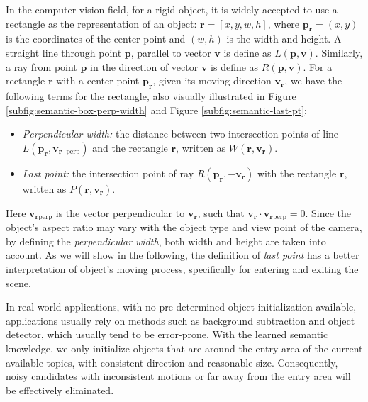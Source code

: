     In the computer vision field, for a rigid object, it is widely accepted to use a rectangle as the representation of an object: $\bm{r} = [x, y, w, h]$, where $\bm{p_r}=(x, y)$ is the coordinates of the center point and $(w, h)$ is the width and height.
    A straight line through point $\bm{p}$, parallel to vector $\bm{v}$ is define as $L(\bm{p}, \bm{v})$. Similarly, a ray from point $\bm{p}$ in the direction of vector $\bm{v}$ is define as $R(\bm{p}, \bm{v})$.
    For a rectangle $\bm{r}$ with a center point $\bm{p_r}$, given its moving direction $\bm{v_r}$, we have the following terms for the rectangle, also visually illustrated in Figure \ref{subfig:semantic-box-perp-width} and Figure \ref{subfig:semantic-last-pt}:  
    \begin{itemize}
        \item \emph{Perpendicular width:} the distance between two intersection points of line $L(\bm{p_r}, \bm{v}_{\bm{r}\cdot\text{perp}})$ and the rectangle $\bm{r}$, written as $W(\bm{r}, \bm{v_r})$. 
        \item \emph{Last point:} the intersection point of ray $R(\bm{p_r}, \bm{-v_r})$ with the rectangle $\bm{r}$, written as $P(\bm{r}, \bm{v_r})$.
    \end{itemize}
    Here $\bm{v}_{\bm{r}\text{perp}}$ is the vector perpendicular to $\bm{v_r}$, such that $\bm{v_r}\cdot\bm{v}_{\bm{r}\text{perp}}=0$. Since the object's aspect ratio may vary with the object type and view point of the camera, by defining the \emph{perpendicular width}, both width and height are taken into account. As we will show in the following, the definition of \emph{last point} has a better interpretation of object's moving process, specifically for entering and exiting the scene.

    

    In real-world applications, with no pre-determined object initialization available, applications usually rely on methods such as background subtraction and object detector, which usually tend to be error-prone.
    With the learned semantic knowledge, we only initialize objects that are around the entry area of the current available topics, with consistent direction and reasonable size. Consequently, noisy candidates with inconsistent motions or far away from the entry area will be effectively eliminated. 

